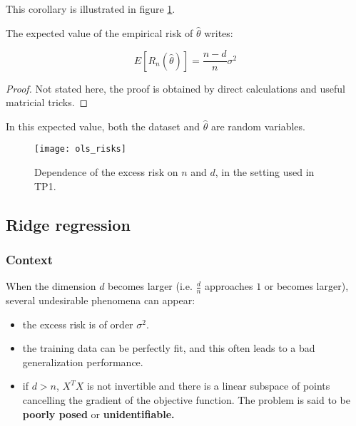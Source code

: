 \documentclass[
10pt, %
a4paper, %
oneside, %
headinclude,footinclude, %
BCOR5mm, %
]{scrartcl}
\begin{document}
This corollary is illustrated in figure \ref{fig:olsrisk}.

\begin{proposition}
    The expected value of the empirical risk of $ \hat{\theta}$ writes:

    \begin{equation}
	E[ R_n( \hat{\theta})] = \frac{n-d}{n} \sigma^2
    \end{equation}
\end{proposition}

\begin{proof}
Not stated here, the proof is obtained by direct calculations and useful matricial tricks.
\end{proof}

\begin{remark}
    In this expected value, both the dataset and $ \hat{\theta}$ are random variables.
\end{remark}

\begin{figure}[htpb]
    \centering
    \texttt{[image: ols\_risks]}
    \caption{Dependence of the excess risk on $n$ and $d$, in the setting used
    in TP1.}
    \label{fig:olsrisk}
\end{figure}

\subsection{\large\color{MidnightBlue}Ridge regression}

\subsubsection{\large\color{Periwinkle}Context}

When the dimension $d$ becomes larger (i.e. $ \frac{d}{n} $ approaches $1$ or becomes larger), several undesirable phenomena can appear:
\begin{itemize}
    \item the excess risk is of order $ \sigma^2$.
    \item the training data can be perfectly fit, and this often leads to a bad generalization performance.
    \item if $d>n$, $X^TX$ is not invertible and there is a linear subspace of points cancelling the gradient of the objective function. The problem is said to be \textbf{{poorly posed}} or \textbf{{unidentifiable.}}
\end{itemize}
\end{document}
